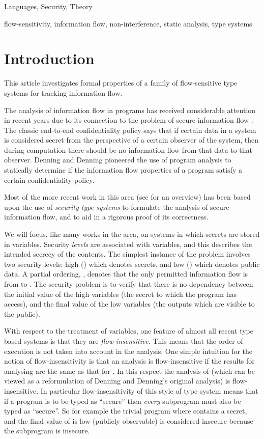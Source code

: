 \documentclass{sigplanconf}
\begin{document}
\terms
Languages, Security, Theory

\keywords
flow-sensitivity,
information flow,
non-interference,
static analysis,
type systems

\section{Introduction}

This article investigates formal properties of a family of
flow-sensitive type systems for tracking information flow.

The analysis of information flow in programs has received considerable
attention in recent years due to its connection to the problem of
secure information flow \cite{Sabelfeld:Myers:JSAC}. The classic
end-to-end confidentiality policy says that if certain data in a
system is considered secret from the perspective of a certain observer
of the system, then during computation there
should be no information flow from that
data to that observer. Denning and Denning
\cite{Denning:Denning:Certification} pioneered the use of program
analysis to statically determine if the information flow properties of
a program satisfy a certain confidentiality policy. 

Most of the more recent work in this area (see  \cite{Sabelfeld:Myers:JSAC} for an overview)
has
been based upon the use of \emph{security type systems} to formulate
the analysis of secure information flow, and to aid in a rigorous
proof of its correctness.

We will focus, like many works in the area, on systems in which
secrets are stored in variables. Security \emph{levels} are associated
with variables, and this describes the intended secrecy of the
contents.  The simplest instance of the problem involves two security
levels: high () which denotes secrets, and low () which denotes
public data.  A partial ordering, , denotes that the only
permitted information flow is from  to . The security problem is
to verify that there is no dependency between the initial value of the
high variables (the secret to which the program has access), and the
final value of the low variables (the outputs which are visible to the
public).

With respect to the treatment of variables, one feature of almost all
recent type based systems is that they are \emph{flow-insensitive}.
This means that the order of execution is not taken into account in
the analysis. One simple intuition for the notion of flow-insensitivity
\cite{Nielson+:Program:Analysis} is that an analysis is
flow-insensitive if the results for analysing  are the same as
that for .  In this respect the analysis of
\cite{Volpano:Smith:Irvine:Sound} (which can be viewed as a
reformulation of Denning and Denning's original analysis) is
flow-insensitive. In particular flow-insensitivity of this style of type
system means that if a program is to be typed as ``secure'' then
\emph{every} subprogram must also be typed as ``secure''. So for
example the trivial program  where  contains a
secret, and the final value of  is low (publicly observable) is
considered insecure because the subprogram  is insecure.
\end{document}
